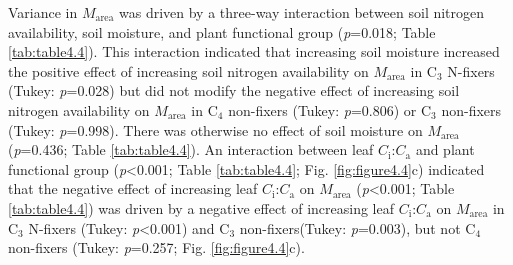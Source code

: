 Variance in $M_\mathrm{area}$ was driven by a three-way interaction between soil nitrogen availability, soil moisture, and plant functional group (\textit{p}=0.018; Table \ref{tab:table4.4}). This interaction indicated that increasing soil moisture increased the positive effect of increasing soil nitrogen availability on $M_\mathrm{area}$ in C$_3$ N-fixers (Tukey: \textit{p}=0.028) but did not modify the negative effect of increasing soil nitrogen availability on $M_\mathrm{area}$ in C$_4$ non-fixers (Tukey: \textit{p}=0.806) or C$_3$ non-fixers (Tukey: \textit{p}=0.998). There was otherwise no effect of soil moisture on $M_\mathrm{area}$ (\textit{p}=0.436; Table \ref{tab:table4.4}). An interaction between leaf $C_\mathrm{i}$:$C_\mathrm{a}$ and plant functional group (\textit{p}<0.001; Table \ref{tab:table4.4}; Fig. \ref{fig:figure4.4}c) indicated that the negative effect of increasing leaf $C_\mathrm{i}$:$C_\mathrm{a}$ on $M_\mathrm{area}$ (\textit{p}<0.001; Table \ref{tab:table4.4}) was driven by a negative effect of increasing leaf $C_\mathrm{i}$:$C_\mathrm{a}$ on $M_\mathrm{area}$ in C$_3$ N-fixers (Tukey: \textit{p}<0.001) and C$_3$ non-fixers(Tukey: \textit{p}=0.003), but not C$_4$ non-fixers (Tukey: \textit{p}=0.257; Fig. \ref{fig:figure4.4}c).

